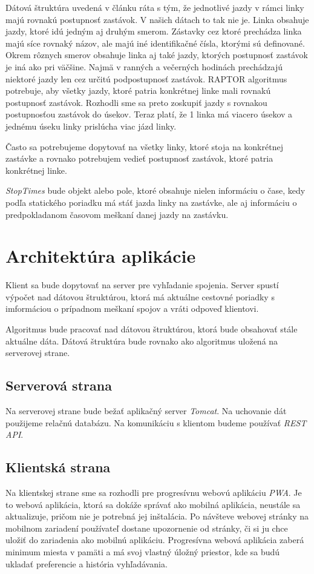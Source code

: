 Dátová štruktúra uvedená v článku ráta s tým, že jednotlivé jazdy v rámci linky majú rovnakú postupnosť zastávok. V našich dátach to tak nie je. Linka obsahuje jazdy, ktoré idú jedným aj druhým smerom. Zástavky cez ktoré prechádza linka majú síce rovnaký názov, ale majú iné identifikačné čísla, ktorými sú definované. Okrem rôznych smerov obsahuje linka aj také jazdy, ktorých postupnosť zastávok je iná ako pri väčšine. Najmä v ranných a večerných hodinách prechádzajú niektoré jazdy len cez určitú podpostupnosť zastávok. 
RAPTOR algoritmus potrebuje, aby všetky jazdy, ktoré patria konkrétnej linke mali rovnakú postupnosť zastávok. Rozhodli sme sa preto zoskupiť jazdy s rovnakou postupnosťou zastávok do úsekov. Teraz platí, že 1 linka má viacero úsekov a jednému úseku linky prislúcha viac jázd linky. 

Často sa potrebujeme dopytovať na všetky linky, ktoré stoja na konkrétnej zastávke a rovnako potrebujem vedieť postupnosť zastávok, ktoré patria konkrétnej linke. 

\textit{StopTimes} bude objekt alebo pole, ktoré obsahuje nielen informáciu o čase, kedy podľa statického poriadku má stáť jazda linky na zastávke, ale aj informáciu o predpokladanom časovom meškaní danej jazdy na zastávku.


\section{Architektúra aplikácie}

Klient sa bude dopytovať na server pre vyhľadanie spojenia. Server spustí výpočet nad dátovou štruktúrou, ktorá má aktuálne cestovné poriadky s imformáciou o prípadnom meškaní spojov a vráti odpoveď klientovi.

Algoritmus bude pracovať nad dátovou štruktúrou, ktorá bude obsahovať stále aktuálne dáta. Dátová štruktúra bude rovnako ako algoritmus uložená na serverovej strane. 

\subsection{Serverová strana}
Na serverovej strane bude bežať aplikačný server \textit{Tomcat}. Na uchovanie dát použijeme relačnú databázu. Na komunikáciu s klientom budeme používať \textit{REST API}.

\subsection{Klientská strana}
Na klientskej strane sme sa rozhodli pre progresívnu webovú aplikáciu \textit{PWA}. Je to webová aplikácia, ktorá sa dokáže správať ako mobilná aplikácia, neustále sa aktualizuje, pričom nie je potrebná jej inštalácia. Po návšteve webovej stránky na mobilnom zariadení používateľ dostane upozornenie od stránky, či si ju chce uložiť do zariadenia ako mobilnú aplikáciu. Progresívna webová aplikácia zaberá minimum miesta v pamäti a má svoj vlastný úložný priestor, kde sa budú ukladať preferencie a história vyhľadávania.

